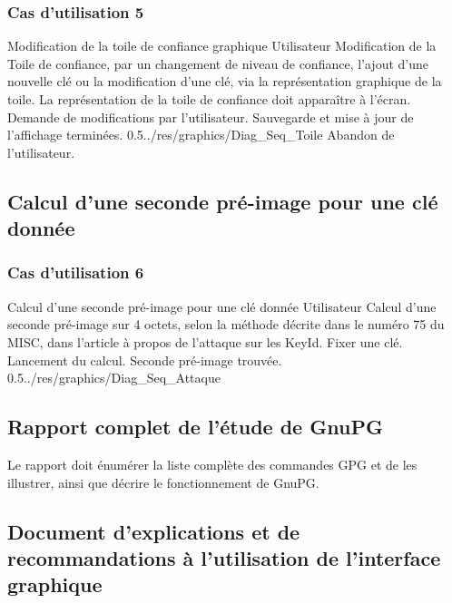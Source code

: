 \documentclass{../res/univ-projet}
\begin{document}
\subsubsection{Cas d'utilisation 5}
\ficheGraphic
{Modification de la toile de confiance graphique}         
{Utilisateur}
{Modification de la Toile de confiance, par un changement de niveau de confiance, l'ajout d'une nouvelle clé ou la modification d'une clé, via la représentation graphique de la toile.}
{La représentation de la toile de confiance doit apparaître à l'écran.}
{Demande de modifications par l'utilisateur.}
{Sauvegarde et mise à jour de l'affichage terminées.}
{0.5}{../res/graphics/Diag_Seq_Toile}
{Abandon de l'utilisateur.}                      
\vspace{0.5cm}
  

\subsection{Calcul d'une seconde pré-image pour une clé donnée}
  
\subsubsection{Cas d'utilisation 6}
\ficheGraphic
{Calcul d'une seconde pré-image pour une clé donnée}
{Utilisateur}
{Calcul d'une seconde pré-image sur 4 octets, selon la méthode décrite dans le numéro 75 du MISC, dans l'article à propos de l'attaque sur les KeyId.}
{Fixer une clé.}
{Lancement du calcul.}
{Seconde pré-image trouvée.}
{0.5}{../res/graphics/Diag_Seq_Attaque}
{}
\vspace{0.5cm}


\subsection{Rapport complet de l'étude de GnuPG}

Le rapport doit énumérer la liste complète des commandes GPG et de les illustrer, ainsi que décrire le fonctionnement de GnuPG.


\subsection{Document d'explications et de recommandations à l'utilisation de l'interface graphique}
\end{document}
